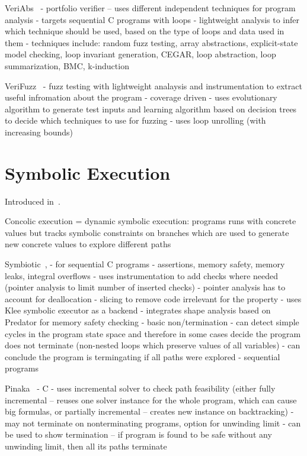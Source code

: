 VeriAbs~\cite{Afzal2019}
- portfolio verifier -- uses different independent techniques for program analysis
- targets sequential C programs with loops
- lightweight analysis to infer which technique should be used, based on the type of loops and data used in them
- techniques include: random fuzz testing, array abstractions, explicit-state model checking, loop invariant generation, CEGAR, loop abstraction, loop summarization, BMC, k-induction

VeriFuzz~\cite{Basak2019}
- fuzz testing with lightweight analaysis and instrumentation to extract useful infromation about the program
- coverage driven
- uses evolutionary algorithm to generate test inputs and learning algorithm based on decision trees to decide which techniques to use for fuzzing
- uses loop unrolling (with increasing bounds)

\section{Symbolic Execution}

Introduced in~\cite{King1976}.

Concolic execution = dynamic symbolic execution: programs runs with concrete values but tracks symbolic constraints on branches which are used to generate new concrete values to explore different paths


Symbiotic~\cite{Chalupa2018}, \cite{Chalupa2020}
- for sequential C programs
- assertions, memory safety, memory leaks, integral overflows
- uses instrumentation to add checks where needed (pointer analysis to limit number of inserted checks)
  - pointer analysis has to account for deallocation
- slicing to remove code irrelevant for the property 
- uses Klee symbolic executor as a backend
- integrates shape analysis based on Predator\cite{TODO} for memory safety checking
- basic non/termination
    - can detect simple cycles in the program state space and therefore in some cases decide the program does not terminate (non-nested loops which preserve values of all variables)
    - can conclude the program is termingating if all paths were explored
- sequential programs

Pinaka~\cite{Chaudhary2019}
- C
- uses incremental solver to check path feasibility (either fully incremental -- reuses one solver instance for the whole program, which can cause big formulas, or partially incremental -- creates new instance on backtracking)
- may not terminate on nonterminating programs, option for unwinding limit
- can be used to show termination -- if program is found to be safe without any unwinding limit, then all its paths terminate

